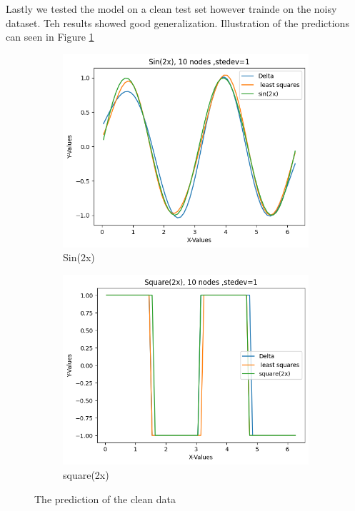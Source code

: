 \documentclass[a4paper]{article}
\begin{document}
Lastly we tested the model on a clean test set however trainde on the noisy dataset. Teh results showed good generalization. Illustration of the predictions can seen in Figure \ref{fig:performance-clean}  

\begin{figure}[htb]
    \centering
    \begin{subfigure}{0.4\textwidth}
        \centering
        \includegraphics[width=\textwidth]{Labs/Lab 2/figures/3.2/Performance_sin(2x)_clean.png}
        \caption{Sin(2x)}
    \end{subfigure}
    \hfill
    \begin{subfigure}{0.4\textwidth}
        \centering
        \includegraphics[width=\textwidth]{Labs/Lab 2/figures/3.2/performance_square(2x)_clean.png}
        \caption{square(2x)}
    \end{subfigure}
    \hfill
    \caption{The prediction of the clean data}
    \label{fig:performance-clean}
\end{figure}
\end{document}
